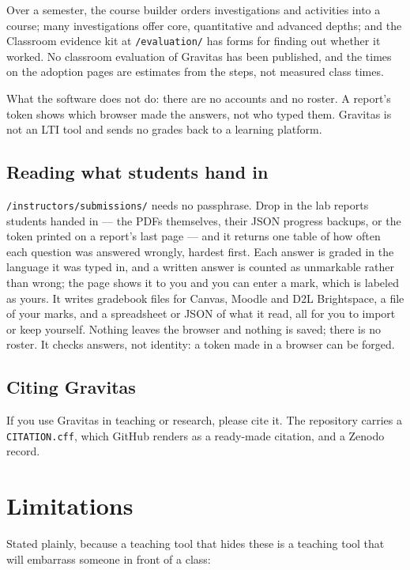 \documentclass[11pt,a4paper]{article}
\newcommand{\ui}[1]{\textsf{#1}}
\begin{document}
Over a semester, the course builder orders investigations and activities into a
course; many investigations offer core, quantitative and advanced depths; and the
\ui{Classroom evidence kit} at \texttt{/evaluation/} has forms for finding out
whether it worked. No classroom evaluation of Gravitas has been published, and
the times on the adoption pages are estimates from the steps, not measured class
times.

What the software does not do: there are no accounts and no roster. A report's
token shows which browser made the answers, not who typed them. Gravitas is not
an LTI tool and sends no grades back to a learning platform.

\subsection{Reading what students hand in}

\texttt{/instructors/submissions/} needs no passphrase. Drop in the lab reports
students handed in --- the PDFs themselves, their JSON progress backups, or the
token printed on a report's last page --- and it returns one table of how often
each question was answered wrongly, hardest first. Each answer is graded in the
language it was typed in, and a written answer is counted as unmarkable rather
than wrong; the page shows it to you and you can enter a mark, which is labeled
as yours. It writes gradebook files for Canvas, Moodle and D2L Brightspace, a
file of your marks, and a spreadsheet or JSON of what it read, all for you to
import or keep yourself. Nothing leaves the browser and nothing is saved; there
is no roster. It checks answers, not identity: a token made in a browser can be
forged.

\subsection{Citing Gravitas}

If you use Gravitas in teaching or research, please cite it. The repository
carries a \texttt{CITATION.cff}, which GitHub renders as a ready-made citation,
and a Zenodo record.

\section{Limitations}

Stated plainly, because a teaching tool that hides these is a teaching tool that
will embarrass someone in front of a class:
\end{document}
